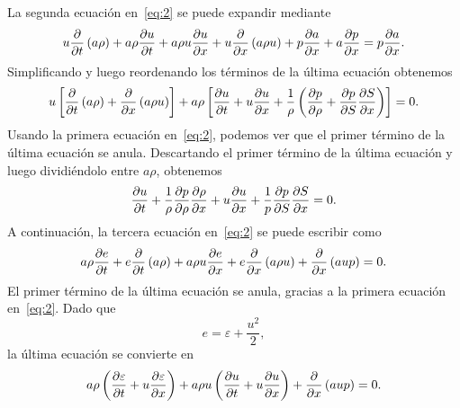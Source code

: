 \documentclass[
    8pt,
    aspectratio=1610,
    c,
    intlimits,
		handout,
    leqno,
    professionalfonts,
]{beamer}
\begin{document}
\begin{frame}
	La segunda ecuación en~\eqref{eq:2} se puede expandir mediante
	\begin{equation*}
		u\diffp{}{t}\left(a\rho\right)+
		a\rho\diffp{u}{t}+
		a\rho u\diffp{u}{x}+
		u\diffp{}{x}\left(a\rho u\right)+
		p\diffp{a}{x}+
		a\diffp{p}{x}=
		p\diffp{a}{x}.
	\end{equation*}
	Simplificando y luego reordenando los términos de la última
	ecuación obtenemos
	\begin{equation*}
		u\left[
			\diffp{}{t}\left(a\rho\right)+
			\diffp{}{x}\left(a\rho u\right)
			\right]+
		a\rho\left[
			\diffp{u}{t}+
			u\diffp{u}{x}+
			\frac{1}{\rho}
			\left(\diffp{p}{\rho}+\diffp{p}{S}\diffp{S}{x}\right)
			\right]=
		0.
	\end{equation*}
	Usando la primera ecuación en~\eqref{eq:2}, podemos ver que el
	primer término de la última ecuación se anula.
	Descartando el primer término de la última ecuación y luego
	dividiéndolo entre $a\rho$, obtenemos
	\begin{equation}\label{eq:4}
		\diffp{u}{t}+
		\frac{1}{\rho}\diffp{p}{\rho}\diffp{\rho}{x}+
		u\diffp{u}{x}+
		\frac{1}{p}
		\diffp{p}{S}
		\diffp{S}{x}=0.
	\end{equation}
	A continuación, la tercera ecuación en~\eqref{eq:2} se puede
	escribir como
	\begin{equation*}
		a\rho\diffp{e}{t}+
		e\diffp{}{t}\left(a\rho\right)+
		a\rho u\diffp{e}{x}+
		e\diffp{}{x}\left(a\rho u\right)+
		\diffp{}{x}\left(aup\right)=
		0.
	\end{equation*}
	El primer término de la última ecuación se anula, gracias a la
	primera ecuación en~\eqref{eq:2}.
	Dado que
	\begin{equation*}
		e=\varepsilon+\frac{u^{2}}{2},
	\end{equation*}
	la última ecuación se convierte en
	\begin{equation*}
		a\rho\left(\diffp{\varepsilon}{t}+u\diffp{\varepsilon}{x}\right)+
		a\rho u\left(\diffp{u}{t}+u\diffp{u}{x}\right)+
		\diffp{}{x}\left(aup\right)=0.
	\end{equation*}
\end{frame}
\end{document}
